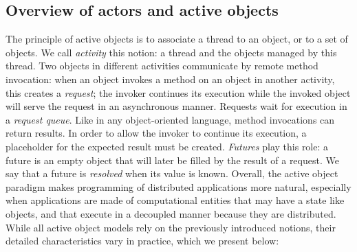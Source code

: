 \subsection{Overview of actors and active objects}\label{overview}
\cite{2013-Henrio}
The principle of active objects is to associate a thread to an object, or to a set of
objects. We call \emph{activity} this notion: a thread and the objects
managed by this thread.  Two objects in different activities 
communicate by remote method invocation: when an object invokes a
method on an object in another activity, this creates a
\emph{request}; the invoker continues its execution while the invoked
object will serve the request in an asynchronous manner. Requests wait for execution in a \emph{request queue}. Like in any
object-oriented language, method invocations can return results. In
order to allow the invoker to continue its execution, a placeholder
for the expected result must be created. \emph{Futures} play this
role: a future is an empty object that will later be filled by the
result of a request. We say that a future is \emph{resolved} when its
value is known.
 Overall, the active object paradigm makes programming of distributed
 applications more natural, especially when applications are made of
computational entities that may have a state like objects, and that
execute in a decoupled manner because they are distributed.
While all active object models rely on the previously introduced notions, their
detailed characteristics vary in practice, which we present below:

